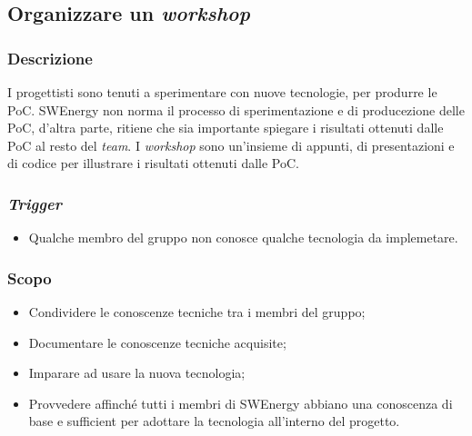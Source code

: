 \subsection{Organizzare un \textit{workshop}}

\subsubsection{Descrizione}

I progettisti sono tenuti a sperimentare con nuove tecnologie, per produrre le
PoC. SWEnergy non norma il processo di sperimentazione e di producezione delle
PoC, d'altra parte, ritiene che sia importante spiegare i risultati ottenuti
dalle PoC al resto del \textit{team}. I \textit{workshop} sono un'insieme di
appunti, di presentazioni e di codice per illustrare i risultati ottenuti dalle
PoC.

\subsubsection{\textit{Trigger}}
\begin{itemize}
	\item Qualche membro del gruppo non conosce qualche tecnologia da
	      implemetare.
\end{itemize}

\subsubsection{Scopo}
\begin{itemize}
	\item Condividere le conoscenze tecniche tra i membri del gruppo;

	\item Documentare le conoscenze tecniche acquisite;

	\item Imparare ad usare la nuova tecnologia;

	\item Provvedere affinché tutti i membri di SWEnergy abbiano una conoscenza
	      di base e sufficient per adottare la tecnologia all'interno del
	      progetto.
\end{itemize}

